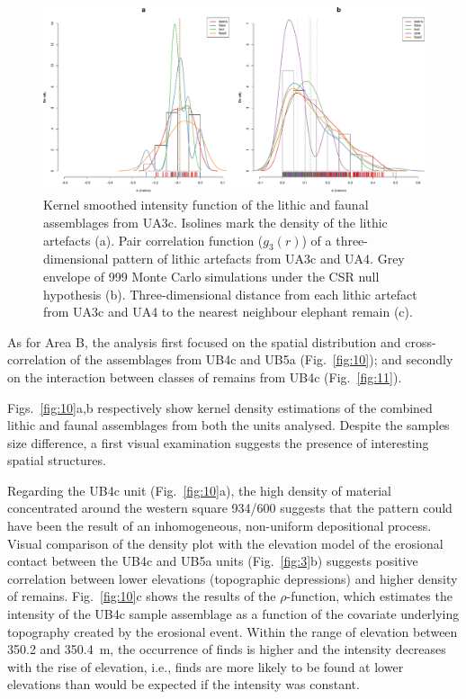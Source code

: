 \documentclass[review,authoryear,times]{elsarticle} %
\begin{document}
\begin{figure}[]
  \centering
  \includegraphics[width=1\textwidth]{../artwork/Fig9.pdf}
  \caption{Kernel smoothed intensity function of the lithic and faunal assemblages from UA3c. Isolines mark the density of the lithic artefacts (a). Pair correlation function ($g_3(r)$) of a three-dimensional pattern of lithic artefacts from UA3c and UA4. Grey envelope of 999 Monte Carlo simulations under the CSR null hypothesis (b). Three-dimensional distance from each lithic artefact from UA3c and UA4 to the nearest neighbour elephant remain (c).}
  \label{fig:9}
\end{figure}


As for Area B, the analysis first focused on the spatial distribution and cross-correlation of the assemblages from UB4c and UB5a (Fig.~\ref{fig:10}); and secondly on the interaction between classes of remains from UB4c (Fig.~\ref{fig:11}).

Figs.~\ref{fig:10}a,b respectively show kernel density estimations of the combined lithic and faunal assemblages from both the units analysed. Despite the samples size difference, a first visual examination suggests the presence of interesting spatial structures.

Regarding the UB4c unit (Fig.~\ref{fig:10}a), the high density of material concentrated around the western square 934/600 suggests that the pattern could have been the result of an inhomogeneous, non-uniform depositional process. Visual comparison of the density plot with the elevation model of the erosional contact between the UB4c and UB5a units (Fig.~\ref{fig:3}b) suggests positive correlation between lower elevations (topographic depressions) and higher density of remains. Fig.~\ref{fig:10}c shows the results of the $\rho$-function, which estimates the intensity of the UB4c sample assemblage as a function of the covariate underlying topography created by the erosional event. Within the range of elevation between 350.2 and 350.4~m, the occurrence of finds is higher and the intensity decreases with the rise of elevation, i.e., finds are more likely to be found at lower elevations than would be expected if the intensity was constant.
\end{document}
